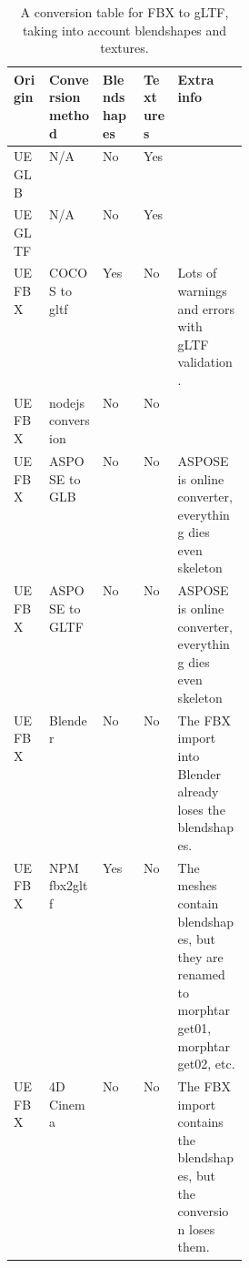 \documentclass{uva-inf-article}
\begin{document}
\begin{table}[ht]
\centering
\begin{tabular}{l|l|l|l|p{0.3\linewidth}} 
\textbf{Origin}  & \textbf{Conversion method} & \textbf{Blendshapes} & \textbf{Textures} & \textbf{Extra info}                                                                                 \\\hline
UE GLB  & N/A               & No          & Yes      &                                                                                            \\\hline
UE GLTF & N/A               & No          & Yes      &                                                                                            \\\hline
UE FBX  & COCOS to gltf     & Yes         & No       & Lots of warnings and errors with gLTF validation.                                          \\\hline
UE FBX  & nodejs conversion & No          & No       &                                                                                            \\\hline
UE FBX  & ASPOSE to GLB     & No          & No       & ASPOSE is online converter, everything dies even skeleton                                  \\\hline
UE FBX  & ASPOSE to GLTF    & No          & No       & ASPOSE is online converter, everything dies even skeleton                                  \\\hline
UE FBX  & Blender           & No          & No       & The FBX import into Blender already loses the blendshapes.                                 \\\hline
UE FBX  & NPM fbx2gltf      & Yes       & No       & The meshes contain blendshapes, but they are renamed to morphtarget01, morphtarget02, etc. \\\hline
UE FBX  & 4D Cinema         & No          & No       & The FBX import contains the blendshapes, but the conversion loses them.                   
\end{tabular}
\caption {A conversion table for FBX to gLTF, taking into account blendshapes and textures.} \label{tab:conversiontable} 
\end{table}
\end{document}
